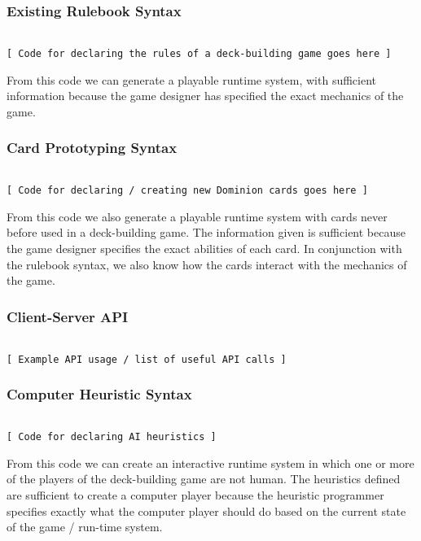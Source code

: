 \documentclass{acm_proc_article-sp}
\begin{document}
\subsubsection{Existing Rulebook Syntax}
\begin{verbatim}

[ Code for declaring the rules of a deck-building game goes here ]
\end{verbatim}

From this code we can generate a playable runtime system, with sufficient information
because the game designer has specified the exact mechanics of the game.

\subsubsection{Card Prototyping Syntax}
\begin{verbatim}

[ Code for declaring / creating new Dominion cards goes here ]
\end{verbatim}

From this code we also generate a playable runtime system with cards never before
used in a deck-building game. The information given is sufficient because the
game designer specifies the exact abilities of each card. In conjunction with the
rulebook syntax, we also know how the cards interact with the mechanics of the game.

\subsubsection{Client-Server API}
\begin{verbatim}

[ Example API usage / list of useful API calls ]
\end{verbatim}

\subsubsection{Computer Heuristic Syntax}
\begin{verbatim}

[ Code for declaring AI heuristics ]
\end{verbatim}

From this code we can create an interactive runtime system in which one or more of the players
of the deck-building game are not human. The heuristics defined are sufficient to create a
computer player because the heuristic programmer specifies exactly what the computer player
should do based on the current state of the game / run-time system.
\end{document}
